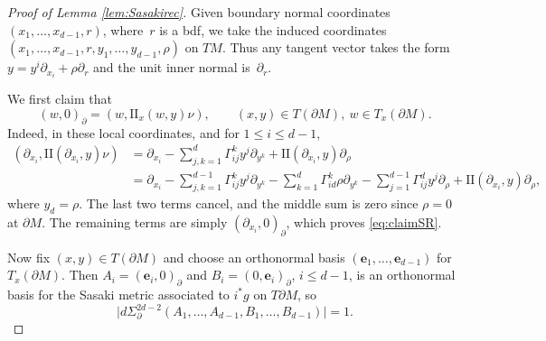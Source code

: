 \documentclass[JEP,XML,SOM,Unicode,NoFloatCountersInSection, NoEqCountersInSection,published]{cedram}
\theoremstyle{plain}
\theoremstyle{definition}
\theoremstyle{remark}
\def\two{\mathrm{II}}
\newcommand{\be}{{\boldsymbol{e}}}
\newcommand{\del}{\partial}
\begin{document}
\begin{proof}[Proof of Lemma \ref{lem:Sasakirec}] Given boundary normal coordinates $(x_1,\dots,x_{d-1},r)$, where~$r$ is a bdf,
we take the induced coordinates $(x_1,\dots,x_{d-1}, r, y_1, \dots, y_{d-1}, \rho)$ on $TM$. Thus any tangent vector takes the
form $y \!=\! y^i \partial_{x_i} \!+\! \rho \partial_r$ and the unit inner normal is~$\partial_r$.

We first claim that\vspace*{-3pt}
\begin{equation}
(w,0)_\partial = (w, \two_x(w,y)\nu), \qquad (x,y)\in T(\partial M),\ w\in T_x(\partial M).
\label{eq:claimSR}
\end{equation}
Indeed, in these local coordinates, and for $1\le i\le d-1$,\vspace*{-3pt}
\begin{align*}
(\partial_{x_i}, \two(\partial_{x_i},y)\nu) &= \partial_{x_i} - \sum_{j,k=1}^d \Gamma_{ij}^k y^j \partial_{y^k} + \two(\partial_{x_i},y) \partial_\rho \\[-2pt]
&= \partial_{x_i} - \sum_{j,k=1}^{d-1} \Gamma_{ij}^k y^j \partial_{y^k} - \sum_{k=1}^{d} \Gamma_{id}^k \rho \partial_{y^k} - \sum_{j=1}^{d-1} \Gamma_{ij}^d y^j \partial_\rho + \two(\partial_{x_i},y) \partial_\rho,
\end{align*}
where $y_d = \rho$. The last two terms cancel, and the middle sum is zero since $\rho=0$ at $\del M$. The remaining terms are simply $(\partial_{x_i},0)_\partial$, which
proves \eqref{eq:claimSR}.

Now fix $(x,y)\in T(\partial M)$ and choose an orthonormal basis $(\be_1, \dots, \be_{d-1})$ for $T_x(\partial M)$.
Then $A_i = (\be_i, 0)_\partial$ and $B_i = (0,\be_i)_\partial$, $i \leq d-1$, is an orthonormal basis for the Sasaki metric associated to
$i^* g$ on $T \partial M$, so
\begin{equation*}
\bigl|d\Sigma_{\partial}^{2d-2}(A_1,\dots,A_{d-1}, B_1, \dots, B_{d-1})\bigr| = 1.
\end{equation*}


\end{proof}
\end{document}
